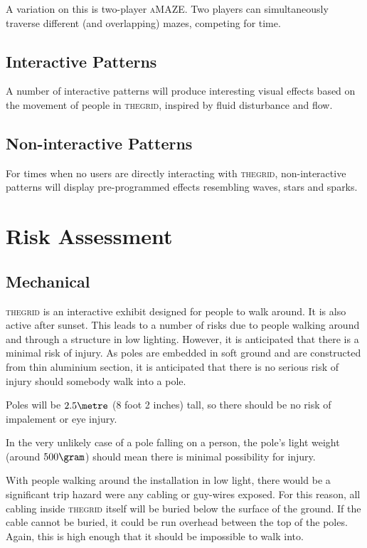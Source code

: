 \documentclass[12pt]{article} %
\newcommand{\thegrid}{\textsc{the\textperiodcentered grid}\xspace}
\newcommand{\amaze}{\textsc{aMAZE}\xspace}
\begin{document}
A variation on this is two-player \amaze.  Two players can simultaneously traverse different (and overlapping) mazes, competing for time.

\subsection{Interactive Patterns}
A number of interactive patterns will produce interesting visual effects based on the movement of people in \thegrid, inspired by fluid disturbance and flow.

\subsection{Non-interactive Patterns}
For times when no users are directly interacting with \thegrid, non-interactive patterns will display pre-programmed effects resembling waves, stars and sparks.

\clearpage
\section{Risk Assessment}
\subsection{Mechanical}
\thegrid is an interactive exhibit designed for people to walk around.  It is also active after sunset.  This leads to a number of risks due to people walking around and through a structure in low lighting.  However, it is anticipated that there is a minimal risk of injury.  As poles are embedded in soft ground and are constructed from thin aluminium section, it is anticipated that there is no serious risk of injury should somebody walk into a pole.

Poles will be $2.5\metre$ (8 foot 2 inches) tall, so there should be no risk of impalement or eye injury.

In the very unlikely case of a pole falling on a person, the pole's light weight (around $500\gram$) should mean there is minimal possibility for injury.

With people walking around the installation in low light, there would be a significant trip hazard were any cabling or guy-wires exposed.  For this reason, all cabling inside \thegrid itself will be buried below the surface of the ground.  If the cable cannot be buried, it could be run overhead between the top of the poles.  Again, this is high enough that it should be impossible to walk into.
\end{document}

